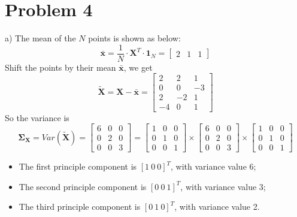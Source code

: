 \documentclass{article}
\begin{document}
\section*{Problem 4}
a) The mean of the $N$ points is shown as below:
\begin{equation}
	\bm{\bar{x}} = \frac{1}{N} \cdot \bm{X}^T \cdot \bm{1}_N =
	\left[
	\begin{array}{ccc}
	2 & 1 & 1
	\end{array}
	\right]	
\end{equation}
Shift the points by their mean $\bm{\bar{x}}$, we get
\begin{equation}
	\bm{\tilde{X}} = \bm{X} - \bm{\bar{x}} = 
	\left[
	\begin{array}{ccc}
	2 & 2 & 1\\
	0 & 0 & -3\\
	2 & -2 & 1\\
	-4 & 0 & 1	
	\end{array}
	\right]	
\end{equation}
So the variance is
\begin{equation}
	\bm{\Sigma_{X}} = Var(\bm{\tilde{X}}) = 
	\left[
	\begin{array}{ccc}
	6 & 0 & 0\\
	0 & 2 & 0\\
	0 & 0 & 3	
	\end{array}
	\right] = 
	\left[
	\begin{array}{ccc}
	1 & 0 & 0\\
	0 & 1 & 0\\
	0 & 0 & 1	
	\end{array}
	\right]\times
	\left[
	\begin{array}{ccc}
	6 & 0 & 0\\
	0 & 2 & 0\\
	0 & 0 & 3	
	\end{array}
	\right] \times
	\left[
	\begin{array}{ccc}
	1 & 0 & 0\\
	0 & 1 & 0\\
	0 & 0 & 1	
	\end{array}
	\right]
\label{covariance}
\end{equation}
\begin{itemize}
	\item The first principle component is $[1 \ 0 \ 0]^T$, with variance value 6;
	\item The second principle component is $[0 \ 0 \ 1]^T$, with variance value 3;
	\item The third principle component is $[0 \ 1 \ 0]^T$, with variance value 2.
\end{itemize}
 
\end{document}

